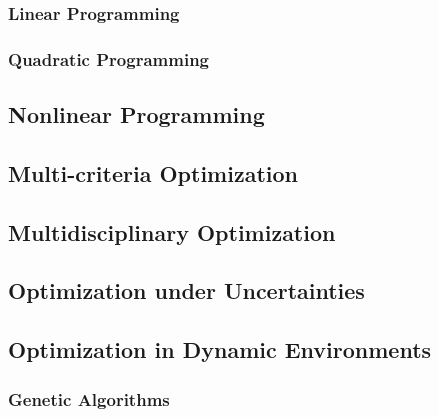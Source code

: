 \subsubsection{Linear Programming}
\subsubsection{Quadratic Programming}
\subsection{Nonlinear Programming}

\subsection{Multi-criteria Optimization}

\subsection{Multidisciplinary Optimization}

\subsection{Optimization under Uncertainties}

\subsection{Optimization in Dynamic Environments}

\subsubsection{Genetic Algorithms}



